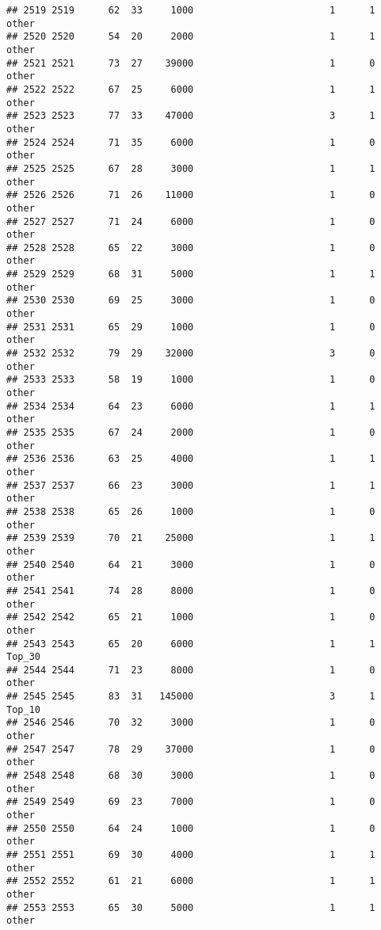 \documentclass[
]{article}
\begin{document}
\begin{verbatim}
## 2519 2519      62  33     1000                        1      1    other
## 2520 2520      54  20     2000                        1      1    other
## 2521 2521      73  27    39000                        1      0    other
## 2522 2522      67  25     6000                        1      1    other
## 2523 2523      77  33    47000                        3      1    other
## 2524 2524      71  35     6000                        1      0    other
## 2525 2525      67  28     3000                        1      1    other
## 2526 2526      71  26    11000                        1      0    other
## 2527 2527      71  24     6000                        1      0    other
## 2528 2528      65  22     3000                        1      0    other
## 2529 2529      68  31     5000                        1      1    other
## 2530 2530      69  25     3000                        1      0    other
## 2531 2531      65  29     1000                        1      0    other
## 2532 2532      79  29    32000                        3      0    other
## 2533 2533      58  19     1000                        1      0    other
## 2534 2534      64  23     6000                        1      1    other
## 2535 2535      67  24     2000                        1      0    other
## 2536 2536      63  25     4000                        1      1    other
## 2537 2537      66  23     3000                        1      1    other
## 2538 2538      65  26     1000                        1      0    other
## 2539 2539      70  21    25000                        1      1    other
## 2540 2540      64  21     3000                        1      0    other
## 2541 2541      74  28     8000                        1      0    other
## 2542 2542      65  21     1000                        1      0    other
## 2543 2543      65  20     6000                        1      1   Top_30
## 2544 2544      71  23     8000                        1      0    other
## 2545 2545      83  31   145000                        3      1   Top_10
## 2546 2546      70  32     3000                        1      0    other
## 2547 2547      78  29    37000                        1      0    other
## 2548 2548      68  30     3000                        1      0    other
## 2549 2549      69  23     7000                        1      0    other
## 2550 2550      64  24     1000                        1      0    other
## 2551 2551      69  30     4000                        1      1    other
## 2552 2552      61  21     6000                        1      1    other
## 2553 2553      65  30     5000                        1      1    other

\end{verbatim}
\end{document}
